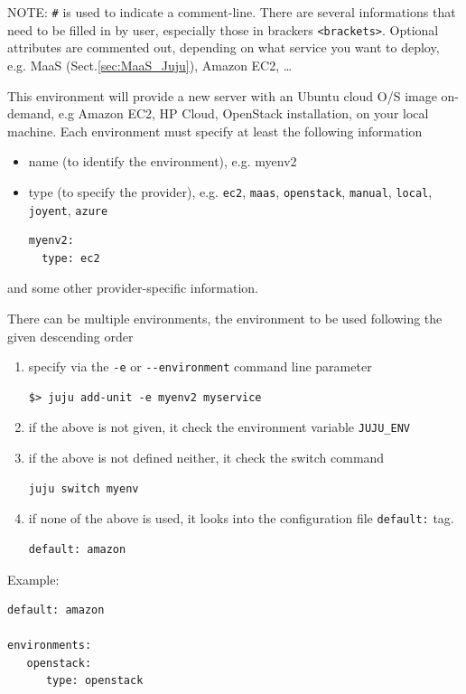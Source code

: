 NOTE: \verb!#! is used to indicate a comment-line.  There are several
informations that need to be filled in by user, especially those in brackers
\verb!<brackets>!. Optional attributes are commented out, depending on what
service you want to deploy, e.g. MaaS (Sect.\ref{sec:MaaS_Juju}), Amazon EC2, \ldots


This environment will provide a new server with an Ubuntu cloud O/S image
on-demand, e.g Amazon EC2, HP Cloud, OpenStack installation, on your local machine.
Each environment must specify at least the following information
\begin{itemize}
  \item name (to identify the environment), e.g. myenv2
  \item type (to specify the provider), e.g. \verb!ec2!, \verb!maas!,
  \verb!openstack!, \verb!manual!, \verb!local!, \verb!joyent!, \verb!azure!
  
\begin{verbatim}
myenv2:
  type: ec2
\end{verbatim}
 \end{itemize}
and some other provider-specific information.

There can be multiple environments, the environment to be used following the
given descending order
\begin{enumerate}
  \item specify via the \verb!-e! or \verb!--environment! command line parameter
\begin{verbatim}
$> juju add-unit -e myenv2 myservice
\end{verbatim}
  
  \item if the above is not given, it check the environment variable
  \verb!JUJU_ENV!
  
  \item if the above is not defined neither, it check the switch command
\begin{verbatim}
juju switch myenv
\end{verbatim}

  \item if none of the above is used, it looks into the configuration file 
 \verb!default:! tag.
\begin{verbatim}
default: amazon
\end{verbatim}

\end{enumerate}

Example:
\begin{verbatim}
default: amazon
 
environments:
   openstack:
      type: openstack
\end{verbatim}


